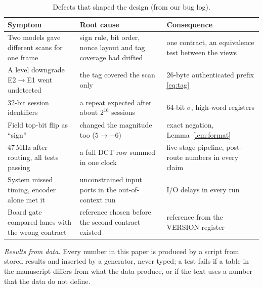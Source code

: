 \begin{table}[t]
\caption{Defects that shaped the design (from our bug log).}
\label{tab:bugs}
\centering\small\setlength{\tabcolsep}{4pt}
\begin{tabular}{p{}p{}p{}}
\toprule
Symptom & Root cause & Consequence \\
\midrule
Two models gave different scans for one frame & sign rule, bit order, nonce layout and tag coverage had drifted & one contract, an equivalence test between the views \\
A level downgrade E2$\to$E1 went undetected & the tag covered the scan only & 26-byte authenticated prefix \eqref{eq:tag} \\
32-bit session identifiers & a repeat expected after about $2^{16}$ sessions & 64-bit $\sigma$, high-word registers \\
Field top-bit flip as ``sign'' & changed the magnitude too ($5 \to -6$) & exact negation, Lemma~\ref{lem:format} \\
47\,MHz after routing, all tests passing & a full DCT row summed in one clock & five-stage pipeline, post-route numbers in every claim \\
System missed timing, encoder alone met it & unconstrained input ports in the out-of-context run & I/O delays in every run \\
Board gate compared lanes with the wrong contract & reference chosen before the second contract existed & reference from the VERSION register \\
\bottomrule
\end{tabular}
\end{table}

\textit{Results from data.} Every number in this paper is produced by a script from stored results and inserted by a generator, never typed; a test fails if a table in the manuscript differs from what the data produce, or if the text uses a number that the data do not define.
